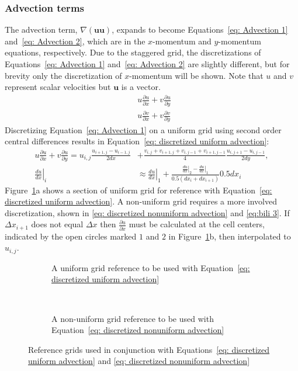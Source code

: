 \subsubsection{Advection terms}
\label{sed:ID NS Advection}
The advection term, $\nabla (\textbf{uu})$, expands to become Equations~\eqref{eq: Advection 1} and~\eqref{eq: Advection 2}, which are in the $x$-momentum and $y$-momentum equations, respectively. 
Due to the staggered grid, the discretizations of Equations~\eqref{eq: Advection 1} and~\eqref{eq: Advection 2} are slightly different, but for brevity only the discretization of $x$-momentum will be shown. 
Note that $u$ and $v$ represent scalar velocities but $\textbf{u}$ is a vector. 
\begin{align}
&u\frac{\partial u}{\partial x} + v\frac{\partial u}{\partial y} \label{eq: Advection 1} \\ 
&u\frac{\partial v}{\partial x} + v\frac{\partial v}{\partial y} \; \label{eq: Advection 2}
\end{align}
Discretizing Equation~\eqref{eq: Advection 1} on a uniform grid using second order central differences results in Equation~\eqref{eq: discretized uniform advection}: 
\begin{align}
u\frac{\partial u}{\partial x} + v\frac{\partial u}{\partial y} = u_{i,j}\frac{u_{i+1,j} - u_{i-1,j}}{2dx} &+ \frac{v_{i,j} + v_{i+1,j} + v_{i,j-1} + v_{i+1,j-1}}{4}\frac{u_{i,j+1} - u_{i,j-1}}{2dy}, \label{eq: discretized uniform advection}\\
\left.\frac{du}{dx}\right|_i&\approx\left.\frac{du}{dx}\right|_1 + \frac{\left.\frac{du}{dx}\right|_2 - \left.\frac{du}{dx}\right|_1}{0.5(dx_i + dx_{i+1})}0.5dx_i\; \label{eq: discretized nonuniform advection} 
\end{align}
Figure~\ref{fig:discretized uniform advection}a shows a section of uniform grid for reference with Equation~\eqref{eq: discretized uniform advection}. 
A non-uniform grid requires a more involved discretization, shown in \eqref{eq: discretized nonuniform advection} and \eqref{eq:bili 3}. 
If $\Delta x_{i+1}$ does not equal $\Delta x$ then $\frac{\partial u}{\partial x}$ must be calculated at the cell centers, indicated by the open circles marked $1$ and $2$ in Figure~\ref{fig:discretized uniform advection}b, then interpolated to $u_{i,j}$. 

\begin{figure}[!htb]
	\centering
	\begin{subfigure}{0.4\textwidth}
		
		\caption{A uniform grid reference to be used with Equation~\eqref{eq: discretized uniform advection}}
	\end{subfigure}
	~
	\begin{subfigure}{0.4\textwidth}
		
		\caption{A non-uniform grid reference to be used with Equation~\eqref{eq: discretized nonuniform advection}}
	\end{subfigure}
	\caption{Reference grids used in conjunction with Equations~\eqref{eq: discretized uniform advection} and \eqref{eq: discretized nonuniform advection}}
	\label{fig:discretized uniform advection}
\end{figure}

